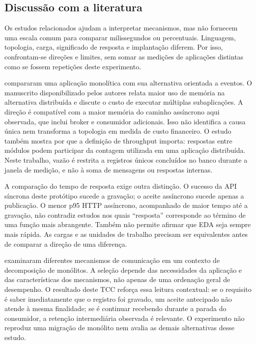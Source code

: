 \subsection{Discussão com a literatura}
\label{sec:discussao-literatura}
Os estudos relacionados ajudam a interpretar mecanismos, mas não fornecem uma escala comum para comparar milissegundos ou percentuais. Linguagem, topologia, carga, significado de resposta e implantação diferem. Por isso, confrontam-se direções e limites, sem somar as medições de aplicações distintas como se fossem repetições deste experimento.

 compararam uma aplicação monolítica com sua alternativa orientada a eventos. O manuscrito disponibilizado pelos autores relata maior uso de memória na alternativa distribuída e discute o custo de executar múltiplas subaplicações. A direção é compatível com a maior memória do caminho assíncrono aqui observada, que inclui broker e consumidor adicionais. Isso não identifica a causa única nem transforma a topologia em medida de custo financeiro. O estudo também mostra por que a definição de throughput importa: respostas entre módulos podem participar da contagem utilizada em uma aplicação distribuída. Neste trabalho, vazão é restrita a registros únicos concluídos no banco durante a janela de medição, e não à soma de mensagens ou respostas internas.

A comparação do tempo de resposta exige outra distinção. O sucesso da API síncrona deste protótipo sucede a gravação; o aceite assíncrono sucede apenas a publicação. O menor p95 HTTP assíncrono, acompanhado de maior tempo até a gravação, não contradiz estudos nos quais ``resposta'' corresponde ao término de uma função mais abrangente. Também não permite afirmar que EDA seja sempre mais rápida. As cargas e as unidades de trabalho precisam ser equivalentes antes de comparar a direção de uma diferença.

 examinaram diferentes mecanismos de comunicação em um contexto de decomposição de monólitos. A seleção depende das necessidades da aplicação e das características dos mecanismos, não apenas de uma ordenação geral de desempenho. O resultado deste TCC reforça essa leitura contextual: se o requisito é saber imediatamente que o registro foi gravado, um aceite antecipado não atende à mesma finalidade; se é continuar recebendo durante a parada do consumidor, a retenção intermediária observada é relevante. O experimento não reproduz uma migração de monólito nem avalia as demais alternativas desse estudo.

